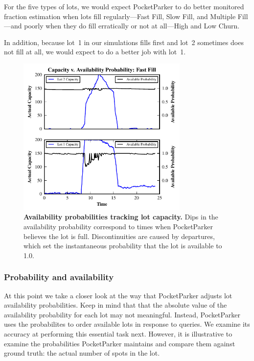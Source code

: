 For the five types of lots, we would expect PocketParker to do better
monitored fraction estimation when lots fill regularly---Fast Fill, Slow
Fill, and Multiple Fill---and poorly when they do fill erratically or not at
all---High and Low Churn. 

In addition, because lot~1 in our simulations fills
first and lot~2 sometimes does not fill at all, we would expect to do a
better job with lot~1. 

\begin{figure}
\centering
\includegraphics[width=3.325in]{./simulator/figures/tracking_fastfill.pdf}

\caption{\textbf{Availability probabilities tracking lot capacity.} Dips in
the availability probability correspond to times when PocketParker believes
the lot is full. Discontinuities are caused by departures, which set the
instantaneous probability that the lot is available to 1.0.}

\label{fig-trackingexample}
\end{figure}

\subsubsection{Probability and availability}

At this point we take a closer look at the way that PocketParker adjusts lot
availability probabilities. Keep in mind that that the absolute value of the
availability probability for each lot may not meaningful. Instead,
PocketParker uses the probabilites to order available lots in response to
queries. We examine its accuracy at performing this essential task next.
However, it is illustrative to examine the probabilities PocketParker
maintains and compare them against ground truth: the actual number of spots
in the lot.

